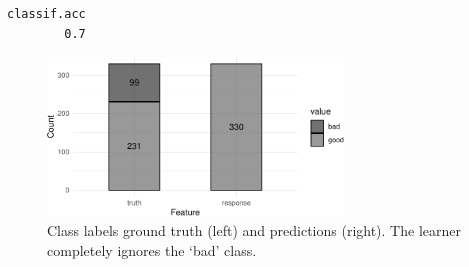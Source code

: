 \begin{Shaded}
\begin{Highlighting}[]
\OtherTok{=} \NormalTok{(}\NormalTok{)}
\OtherTok{=} \NormalTok{(}\NormalTok{, } \NormalTok{)}
\OtherTok{=} 
\SpecialCharTok{$}\SpecialCharTok{$}
\OtherTok{=}\SpecialCharTok{$}\SpecialCharTok{$}
\SpecialCharTok{$}\NormalTok{(}\NormalTok{(}\NormalTok{))}
\end{Highlighting}
\end{Shaded}

\begin{verbatim}
classif.acc 
        0.7 
\end{verbatim}

\begin{Shaded}
\begin{Highlighting}[]
\end{Highlighting}
\end{Shaded}

\begin{figure}

{\centering \includegraphics[width=0.7\textwidth,height=\textheight]{chapters/chapter2/data_and_basic_modeling_files/figure-pdf/fig-basics-classlabels-german-1.pdf}

}

\caption{\label{fig-basics-classlabels-german}Class labels ground truth
(left) and predictions (right). The learner completely ignores the `bad'
class.}

\end{figure}

